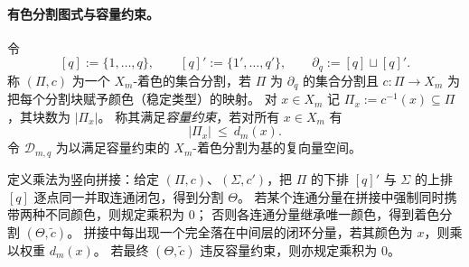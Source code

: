 \paragraph{有色分割图式与容量约束。}
令
\[
[q]:=\{1,\dots,q\},\qquad [q]':=\{1',\dots,q'\},\qquad \partial_q:=[q]\sqcup[q]'.
\]
称 \((\Pi,c)\) 为一个 \(X_m\)-着色的集合分割，若 \(\Pi\) 为 \(\partial_q\) 的集合分割且 \(c:\Pi\to X_m\) 为把每个分割块赋予颜色（稳定类型）的映射。
对 \(x\in X_m\) 记 \(\Pi_x:=c^{-1}(x)\subseteq \Pi\)，其块数为 \(|\Pi_x|\)。
称其满足\emph{容量约束}，若对所有 \(x\in X_m\) 有
\[
|\Pi_x|\ \le\ d_m(x).
\]
令 \(\mathcal D_{m,q}\) 为以满足容量约束的 \(X_m\)-着色分割为基的复向量空间。
\par
定义乘法为竖向拼接：给定 \((\Pi,c)\)、\((\Sigma,c')\)，把 \(\Pi\) 的下排 \([q]'\) 与 \(\Sigma\) 的上排 \([q]\) 逐点同一并取连通闭包，得到分割 \(\Theta\)。
若某个连通分量在拼接中强制同时携带两种不同颜色，则规定乘积为 \(0\)；
否则各连通分量继承唯一颜色，得到着色分割 \((\Theta,\widetilde c)\)。
拼接中每出现一个完全落在中间层的闭环分量，若其颜色为 \(x\)，则乘以权重 \(d_m(x)\)。
若最终 \((\Theta,\widetilde c)\) 违反容量约束，则亦规定乘积为 \(0\)。

